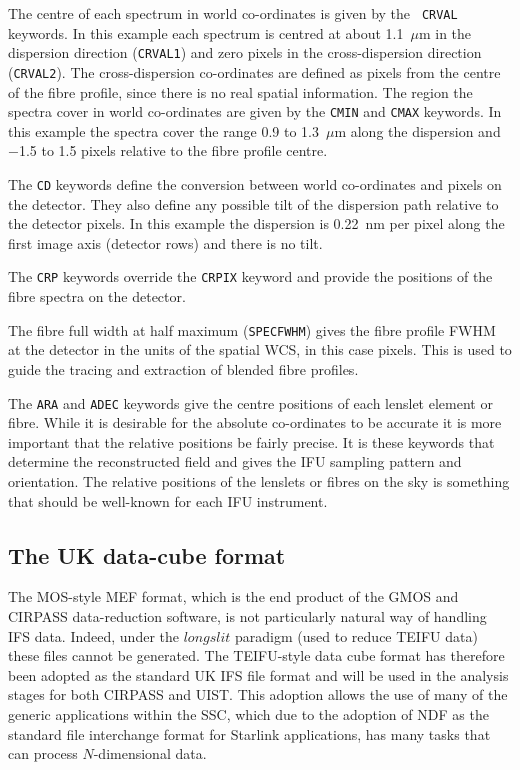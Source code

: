 \documentclass[twoside,11pt]{article}
\newcommand{\htmlref}[2]{#1}
\newcommand{\xref}[3]{#1}
\newcommand{\xlabel}[1]{}
\begin{document}
The centre of each spectrum in world co-ordinates is given by the {\tt
CRVAL} keywords.  In this example each spectrum is centred at about
1.1~$\mu$m in the dispersion direction ({\tt CRVAL1}) and zero pixels
in the cross-dispersion direction ({\tt CRVAL2}).  The cross-dispersion
co-ordinates are defined as pixels from the centre of the fibre
profile, since there is no real spatial information.  The region the
spectra cover in world co-ordinates are given by the {\tt CMIN} and
{\tt CMAX} keywords.  In this example the spectra cover the range 0.9
to 1.3~$\mu$m along the dispersion and $-$1.5 to 1.5 pixels relative to
the fibre profile centre.

The {\tt CD} keywords define the conversion between world co-ordinates
and pixels on the detector.  They also define any possible tilt of the
dispersion path relative to the detector pixels.  In this example the
dispersion is 0.22~nm per pixel along the first image axis (detector
rows) and there is no tilt.

The {\tt CRP} keywords override the {\tt CRPIX} keyword and provide
the positions of the fibre spectra on the detector.

The fibre full width at half maximum ({\tt SPECFWHM}) gives the fibre
profile FWHM at the detector in the units of the spatial WCS, in this
case pixels.  This is used to guide the tracing and extraction of
blended fibre profiles.

The {\tt ARA} and {\tt ADEC} keywords give the centre positions of
each lenslet element or fibre.  While it is desirable for the absolute
co-ordinates to be accurate it is more important that the relative
positions be fairly precise.  It is these keywords that determine the
reconstructed field and gives the IFU sampling pattern and
orientation.  The relative positions of the lenslets or fibres on the
sky is something that should be well-known for each IFU instrument.

\subsection{\xlabel{sc16_teifufile}The UK data-cube format\label{sc16_teifufile}}

The MOS-style \htmlref{MEF format}{sc16_gmosfile}, which is the end
product of the GMOS and CIRPASS data-reduction software, is not
particularly natural way of handling IFS data.  Indeed, under the
$longslit$ paradigm (used to reduce TEIFU data) these files cannot be
generated.  The TEIFU-style data cube format has therefore been
adopted as the standard UK IFS file format and will be used in the
analysis stages for both CIRPASS and UIST.  This adoption allows the
use of many of the generic applications within the SSC, which due to
the adoption of \xref{NDF}{sun33}{} as the standard file interchange
format for Starlink applications, has many tasks that can process
$N$-dimensional data.
\end{document}

